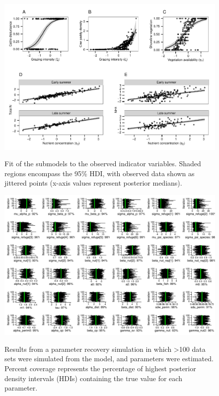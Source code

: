 \begin{figure}[htbp]
\caption[Submodel fit for observed indicator variables]{
Fit of the submodels to the observed indicator variables. Shaded regions
encompass the 95\% HDI, with observed data shown as jittered points
(x-axis values represent posterior medians).
}
\centering
\includegraphics[width=150mm]{figs/ch3/fig4.pdf}
\label{3-4}
\end{figure}

\begin{figure}[htbp]
\caption[Parameter recovery and interval coverage]{
Results from a parameter recovery simulation in which \textgreater{}100
data sets were simulated from the model, and parameters were estimated.
Percent coverage represents the percentage of highest posterior density
intervals (HDIs) containing the true value for each parameter.
}
\centering
\includegraphics[width=150mm]{figs/ch3/fig_s1.pdf}
\label{3-a1}
\end{figure}


